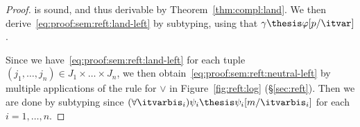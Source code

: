 \begin{proof}
\noindent
is sound, and thus derivable by Theorem~\ref{thm:compl:land}.
We then derive~\eqref{eq:proof:sem:reft:land-left}
by subtyping,
using that $\gamma \thesis \varphi[p / \itvar]$.

Since we have~\eqref{eq:proof:sem:reft:land-left}
for each tuple $(j_1,\dots,j_n) \in J_1 \times \dots \times J_n$,
we then obtain~\eqref{eq:proof:sem:reft:neutral-left}
by multiple applications
of the rule for $\lor$ in Figure~\ref{fig:reft:log} (\S\ref{sec:reft}).
Then we are done by subtyping since
$(\forall \itvarbis_i)\psi_i \thesis \psi_i[m / \itvarbis_i]$
for each $i = 1,\dots,n$.
\end{proof}







